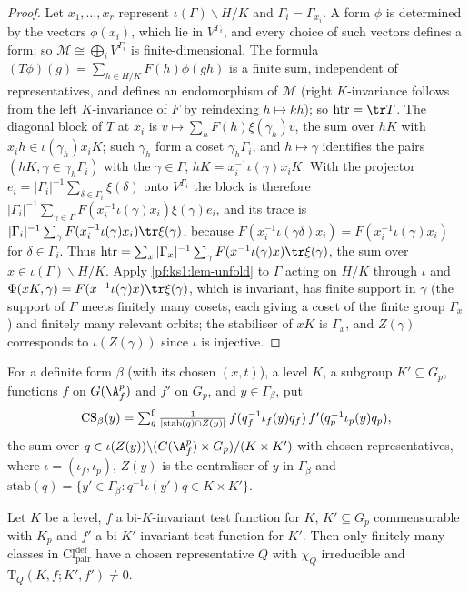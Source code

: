 \begin{proof}
Let $x_1,\dots,x_r$ represent $\iota(\Gamma)\backslash H/K$ and $\Gamma_i=\Gamma_{x_i}$. A form $\phi$ is determined by the vectors
$\phi(x_i)$, which lie in $V^{\Gamma_i}$, and every choice of such vectors defines a form; so $\mathcal M\cong\bigoplus_iV^{\Gamma_i}$ is
finite-dimensional. The formula $(T\phi)(g)=\sum_{h\in H/K}F(h)\phi(gh)$ is a finite sum, independent of representatives, and defines
an endomorphism of $\mathcal M$ (right $K$-invariance follows from the left $K$-invariance of $F$ by reindexing $h\mapsto kh$); so
$\mathrm{htr}=\tr T$. The diagonal block of $T$ at $x_i$ is $v\mapsto\sum_hF(h)\xi(\gamma_h)v$, the sum over $hK$ with
$x_ih\in\iota(\gamma_h)x_iK$; such $\gamma_h$ form a coset $\gamma_h\Gamma_i$, and $h\mapsto\gamma$ identifies the pairs
$(hK,\gamma\in\gamma_h\Gamma_i)$ with the $\gamma\in\Gamma$, $hK=x_i^{-1}\iota(\gamma)x_iK$. With the projector
$e_i=|\Gamma_i|^{-1}\sum_{\delta\in\Gamma_i}\xi(\delta)$ onto $V^{\Gamma_i}$ the block is therefore
$|\Gamma_i|^{-1}\sum_{\gamma\in\Gamma}F(x_i^{-1}\iota(\gamma)x_i)\xi(\gamma)e_i$, and its trace is
$|\Gamma_i|^{-1}\sum_\gamma F(x_i^{-1}\iota(\gamma)x_i)\tr\xi(\gamma)$, because $F(x_i^{-1}\iota(\gamma\delta)x_i)=F(x_i^{-1}\iota(\gamma)x_i)$
for $\delta\in\Gamma_i$. Thus $\mathrm{htr}=\sum_{x}|\Gamma_x|^{-1}\sum_{\gamma}F(x^{-1}\iota(\gamma)x)\tr\xi(\gamma)$, the sum over
$x\in\iota(\Gamma)\backslash H/K$. Apply \cref{pf:ks1:lem-unfold} to $\Gamma$ acting on $H/K$ through $\iota$ and
$\Phi(xK,\gamma)=F(x^{-1}\iota(\gamma)x)\tr\xi(\gamma)$, which is invariant, has finite support in $\gamma$ (the support of $F$ meets
finitely many cosets, each giving a coset of the finite group $\Gamma_x$) and finitely many relevant orbits; the stabiliser of $xK$ is
$\Gamma_x$, and $Z(\gamma)$ corresponds to $\iota(Z(\gamma))$ since $\iota$ is injective.
\end{proof}

For a definite form $\beta$ (with its chosen $(x,t)$), a level $K$, a subgroup $K'\subseteq G_p$, functions $f$ on $G(\ksoneAfp)$ and $f'$ on $G_p$,
and $y\in\Gamma_\beta$, put
\[\mathrm{CS}_\beta(y)=\textstyle\sum\nolimits^{\mathrm f}_{q}\frac{1}{|\mathrm{stab}(q)\cap Z(y)|}\,f(q_f^{-1}\iota_f(y)q_f)\,f'(q_p^{-1}\iota_p(y)q_p),\]
the sum over $q\in\iota(Z(y))\backslash(G(\ksoneAfp)\times G_p)/(K\times K')$ with chosen representatives, where $\iota=(\iota_f,\iota_p)$, $Z(y)$ is the
centraliser of $y$ in $\Gamma_\beta$ and $\mathrm{stab}(q)=\{y'\in\Gamma_\beta:q^{-1}\iota(y')q\in K\times K'\}$.

\begin{lemma}\label{pf:ks1:lem-dfin}
Let $K$ be a level, $f$ a bi-$K$-invariant test function for $K$, $K'\subseteq G_p$ commensurable with $K_p$ and $f'$ a bi-$K'$-invariant test
function for $K'$. Then only finitely many classes in $\mathrm{Cl}^{\mathrm{def}}_{\mathrm{pair}}$ have a chosen representative $Q$ with $\chi_Q$
irreducible and $\mathrm T_Q(K,f;K',f')\neq0$.
\end{lemma}

